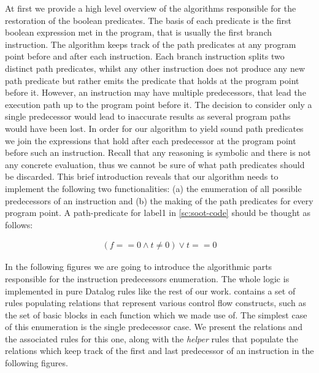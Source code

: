 At first we provide a high level overview of the algorithms responsible
for the restoration of the boolean predicates. The basis of each predicate is
the first boolean expression met in the program, that is usually the first
branch instruction. The algorithm keeps track of the path predicates at any
program point before and after each instruction. Each branch instruction splits
two distinct path predicates, whilst any other instruction does not produce
any new path predicate but rather emits the predicate that holds at the program
point before it. However, an instruction may have multiple
predecessors, that lead the execution path
up to the program point before it. The decision to consider only a single predecessor
would lead to inaccurate results as several program paths would have been lost. In
order for our algorithm to yield sound path predicates we join the
expressions that hold after each predecessor at the program point before such an
instruction. Recall that any reasoning is symbolic and there is not any concrete
evaluation, thus we cannot be sure of what path predicates should be discarded.
This brief introduction reveals that our algorithm needs to implement
the following two functionalities: (a) the enumeration of all possible predecessors
of an instruction and (b) the making of the path predicates for every program
point. A path-predicate for label1 in \ref{sc:soot-code} should be thought as follows:

\begin{figure}[th]
  \begin{equation}
     \begin{aligned}
      \left(f == 0 \land t \neq 0\right) \lor t == 0
    \end{aligned}
  \end{equation}
  \label{fig:path-predicate-ex}
\end{figure}

In the following figures we are going to introduce the algorithmic parts responsible
for the instruction predecessors enumeration. The whole logic is implemented in
pure Datalog rules like the rest of our work. \doop{} contains a set of rules
populating relations that represent various control flow constructs, such as
the set of basic blocks in each function which we made use of. The simplest case
of this enumeration is the single predecessor case. We present the relations
and the associated rules for this one, along with the \emph{helper} rules that populate the
relations which keep track of the first and last predecessor of an instruction in
the following figures.

